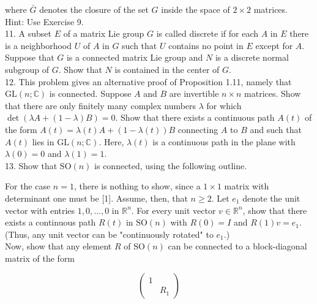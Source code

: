 \documentclass[10pt, letterpaper]{article}
\begin{document}
where $\bar{G}$ denotes the closure of the set $G$ inside the space of $2 \times 2$ matrices.\\
Hint: Use Exercise 9.\\
11. A subset $E$ of a matrix Lie group $G$ is called discrete if for each $A$ in $E$ there is a neighborhood $U$ of $A$ in $G$ such that $U$ contains no point in $E$ except for $A$. Suppose that $G$ is a connected matrix Lie group and $N$ is a discrete normal subgroup of $G$. Show that $N$ is contained in the center of $G$.\\
12. This problem gives an alternative proof of Proposition 1.11, namely that $\mathrm{GL}(n ; \mathbb{C})$ is connected. Suppose $A$ and $B$ are invertible $n \times n$ matrices. Show that there are only finitely many complex numbers $\lambda$ for which $\operatorname{det}(\lambda A+(1-\lambda) B)=0$. Show that there exists a continuous path $A(t)$ of the form $A(t)=\lambda(t) A+(1-\lambda(t)) B$ connecting $A$ to $B$ and such that $A(t)$ lies in $\mathrm{GL}(n ; \mathbb{C})$. Here, $\lambda(t)$ is a continuous path in the plane with $\lambda(0)=0$ and $\lambda(1)=1$.\\
13. Show that $\mathrm{SO}(n)$ is connected, using the following outline.

For the case $n=1$, there is nothing to show, since a $1 \times 1$ matrix with determinant one must be [1]. Assume, then, that $n \geq 2$. Let $e_{1}$ denote the unit vector with entries $1,0, \ldots, 0$ in $\mathbb{R}^{n}$. For every unit vector $v \in \mathbb{R}^{n}$, show that there exists a continuous path $R(t)$ in $\mathrm{SO}(n)$ with $R(0)=I$ and $R(1) v=e_{1}$. (Thus, any unit vector can be "continuously rotated" to $e_{1}$.)\\
Now, show that any element $R$ of $\mathrm{SO}(n)$ can be connected to a block-diagonal matrix of the form

$$
\left(\begin{array}{ll}
1 & \\
& R_{1}
\end{array}\right)
$$
\end{document}
